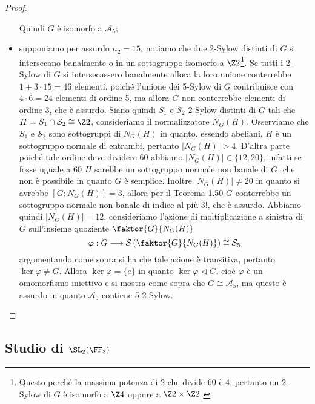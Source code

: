 \documentclass[11pt]{scrartcl}
\begin{document}
\begin{proof}
\begin{itemize}
        Quindi $G$ è isomorfo a $\mathcal{A}_5$;
        \item supponiamo per assurdo $n_2 = 15$, notiamo che due 2-Sylow distinti
        di $G$ si intersecano banalmente 
        o in un sottogruppo isomorfo a $\Z2$\footnote{
            Questo perché la massima potenza di 2 che divide 60 è 4, pertanto
            un 2-Sylow di $G$ è isomorfo a $\Z4$ oppure a $\Z2\times \Z2$.
        }. Se tutti i 2-Sylow di $G$ si intersecassero banalmente allora la 
        loro unione conterrebbe $1 + 3\cdot 15 = 46$ elementi, poiché l'unione dei
        5-Sylow di $G$ contribuisce con $4\cdot 6 = 24$ elementi di ordine 5,
        ma allora $G$ non conterrebbe elementi di ordine 3, che è assurdo.
        Siano quindi $S_1$ e $\mathcal{S}_2$ 2-Sylow distinti di $G$ tali che 
        $H = S_1\cap \mathcal{S}_2 \cong \Z2$, consideriamo il normalizzatore $N_G(H)$.
        Osserviamo che $S_1$ e $\mathcal{S}_2$ sono sottogruppi di $N_G(H)$ in quanto, essendo
        abeliani, $H$ è un sottogruppo normale di entrambi, pertanto $|N_G(H)| > 4$.
        D'altra parte poiché tale ordine deve dividere 60 abbiamo 
        $|N_G(H)| \in \{12, 20\}$, infatti se fosse uguale a 60 $H$ sarebbe un 
        sottogruppo normale non banale di $G$, che non è possibile in quanto $G$
        è semplice. Inoltre $|N_G(H)| \neq 20$ in quanto si avrebbe $[G:N_G(H)] = 3$,
        allora per il \hyperref[teorema1.50]{Teorema 1.50} $G$ conterrebbe
        un sottogruppo normale non banale di indice al più $3!$, che è assurdo.
        Abbiamo quindi $|N_G(H)| = 12$, consideriamo l'azione di 
        moltiplicazione a sinistra di $G$ sull'insieme quoziente $\faktor{G}{N_G(H)}$
        \[
            \varphi : G\longrightarrow\mathcal{S}\left(\faktor{G}{N_G(H)}\right)\cong \mathcal{S}_5
        \]
        argomentando come sopra si ha che tale azione è transitiva, pertanto
        $\ker\varphi \neq G$. Allora $\ker\varphi = \{e\}$ in quanto 
        $\ker\varphi\triangleleft G$, cioè $\varphi$ è un omomorfismo iniettivo
        e si mostra come sopra che $G \cong \mathcal{A}_5$, ma questo è assurdo 
        in quanto $\mathcal{A}_5$ contiene 5 2-Sylow.
    \end{itemize}
\end{proof}

\newpage

\subsection{Studio di $\SL_2(\FF_3)$}
\end{document}
